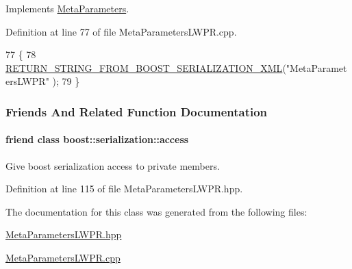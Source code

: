 Implements \hyperlink{classDmpBbo_1_1MetaParameters_af084bff2ddd6233e9a898faa23f6195c}{Meta\+Parameters}.



Definition at line 77 of file Meta\+Parameters\+L\+W\+P\+R.\+cpp.


\begin{DoxyCode}
77                                               \{
78   \hyperlink{BoostSerializationToString_8hpp_a244fa2647b6577d9be517958dccbb5e8}{RETURN\_STRING\_FROM\_BOOST\_SERIALIZATION\_XML}(\textcolor{stringliteral}{"MetaParametersLWPR"}
      );
79 \}
\end{DoxyCode}


\subsubsection{Friends And Related Function Documentation}
\hypertarget{classDmpBbo_1_1MetaParametersLWPR_ac98d07dd8f7b70e16ccb9a01abf56b9c}{
\paragraph[{boost\+::serialization\+::access}]{\setlength{\rightskip}{0pt plus 5cm}friend class boost\+::serialization\+::access\hspace{0.3cm}{\ttfamily [friend]}}}\label{classDmpBbo_1_1MetaParametersLWPR_ac98d07dd8f7b70e16ccb9a01abf56b9c}


Give boost serialization access to private members. 



Definition at line 115 of file Meta\+Parameters\+L\+W\+P\+R.\+hpp.



The documentation for this class was generated from the following files\+:\begin{DoxyCompactItemize}
\item 
\hyperlink{MetaParametersLWPR_8hpp}{Meta\+Parameters\+L\+W\+P\+R.\+hpp}\item 
\hyperlink{MetaParametersLWPR_8cpp}{Meta\+Parameters\+L\+W\+P\+R.\+cpp}\end{DoxyCompactItemize}
